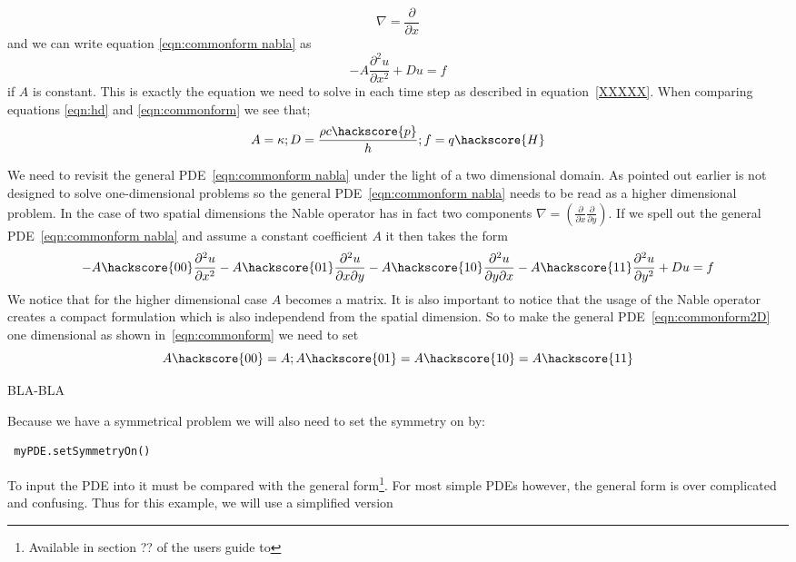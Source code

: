 \begin{equation}
\nabla = \frac{\partial}{\partial x}
\end{equation}
and we can write equation \ref{eqn:commonform nabla} as
\begin{equation}\label{eqn:commonform}
-A\frac{\partial^{2}u}{\partial x^{2}} + Du = f
\end{equation}
if $A$ is constant. This is exactly the equation we need to solve 
in each time step as described in equation~\ref{XXXXX}. When comparing equations \eqref{eqn:hd} and \eqref{eqn:commonform} we see that;
\begin{equation}
A = \kappa; D = \frac{\rho c \hackscore{p}}{h}; f = q \hackscore{H}
\end{equation}

We need to revisit the general PDE~\ref{eqn:commonform nabla} under the light of a
two dimensional domain. As pointed out earlier \ESCRIPT is not designed
to solve one-dimensional problems so the general PDE~\ref{eqn:commonform nabla} 
needs to be read as a higher dimensional problem. In the case of
two spatial dimensions the Nable operator has in fact 
two components $\nabla = (\frac{\partial}{\partial x}
\frac{\partial}{\partial y})$. If we spell out the general PDE~\ref{eqn:commonform nabla} and assume a constant coefficient $A$ it then takes the form
\begin{equation}\label{eqn:commonform2D}
-A\hackscore{00}\frac{\partial^{2}u}{\partial x^{2}} 
-A\hackscore{01}\frac{\partial^{2}u}{\partial x\partial y} 
-A\hackscore{10}\frac{\partial^{2}u}{\partial y\partial x} 
-A\hackscore{11}\frac{\partial^{2}u}{\partial y^{2}} 
+ Du = f
\end{equation}
We notice that for the higher dimensional case $A$ becomes a matrix. It is also
important to notice that the usage of the Nable operator creates
a compact formulation which is also independend from the spatial dimension. 
So to make the general PDE~\ref{eqn:commonform2D} one dimensional as
shown in~\ref{eqn:commonform} we need to set
\begin{equation}\label{eqn:commonform2D}
A\hackscore{00}=A; A\hackscore{01}=A\hackscore{10}=A\hackscore{11}
\end{equation}


BLA-BLA





Because we have a symmetrical problem we will also need to set the symmetry on by:
\begin{verbatim}
 myPDE.setSymmetryOn()
\end{verbatim}
To input the PDE into \esc it must be compared with the general form\footnote{Available in section ?? of the users guide to \esc }. For most simple PDEs however, the general form is over complicated and confusing. Thus for this example, we will use a simplified version 




